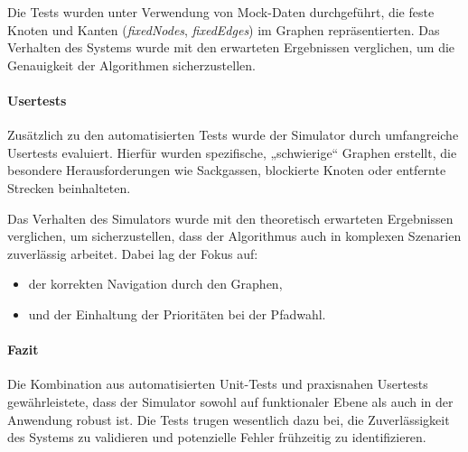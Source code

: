 \documentclass[main.tex]{subfiles} %
\begin{document}
Die Tests wurden unter Verwendung von Mock-Daten durchgeführt, die
feste Knoten und Kanten (\textit{fixedNodes}, \textit{fixedEdges}) im
Graphen repräsentierten. Das Verhalten des Systems wurde mit den
erwarteten Ergebnissen verglichen, um die Genauigkeit der Algorithmen
sicherzustellen.

\paragraph{Usertests}

Zusätzlich zu den automatisierten Tests wurde der Simulator durch
umfangreiche Usertests evaluiert. Hierfür wurden spezifische,
„schwierige“ Graphen erstellt, die besondere Herausforderungen wie
Sackgassen, blockierte Knoten oder entfernte Strecken beinhalteten.

Das Verhalten des Simulators wurde mit den theoretisch erwarteten
Ergebnissen verglichen, um sicherzustellen, dass der Algorithmus auch
in komplexen Szenarien zuverlässig arbeitet. Dabei lag der Fokus auf:
\begin{itemize}
  \item der korrekten Navigation durch den Graphen,
  \item und der Einhaltung der Prioritäten bei der Pfadwahl.
\end{itemize}

\paragraph{Fazit}

Die Kombination aus automatisierten Unit-Tests und praxisnahen
Usertests gewährleistete, dass der Simulator sowohl auf funktionaler
Ebene als auch in der Anwendung robust ist. Die Tests trugen
wesentlich dazu bei, die Zuverlässigkeit des Systems zu validieren
und potenzielle Fehler frühzeitig zu identifizieren.
\end{document}
